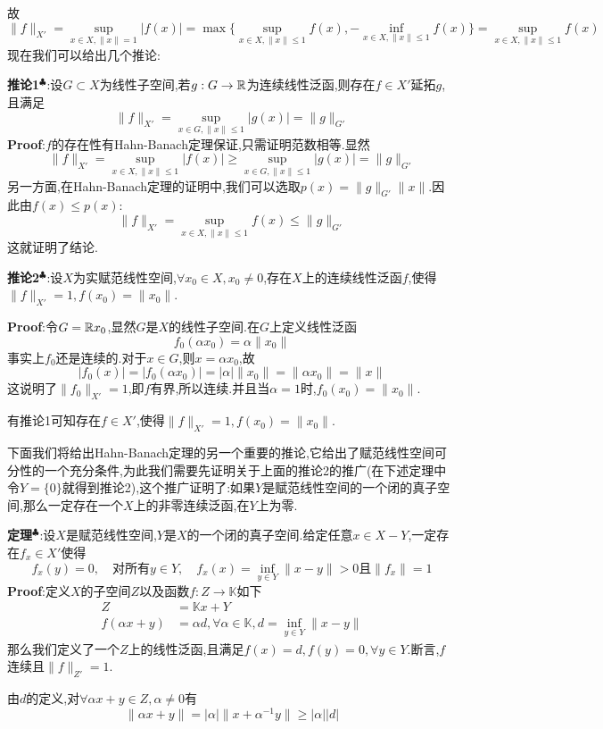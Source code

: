 故
$$
\|f\|_{X'}=\sup_{x\in X,\|x\|=1}|f(x)|=\max\{\sup_{x\in X,\|x\|\leqslant 1}f(x),-\inf_{x\in X,\|x\|\leqslant 1}f(x)\}=\sup_{x\in X,\|x\|\leqslant 1}f(x)
$$
\qquad 现在我们可以给出几个推论:\par
\textbf{推论1}$^\clubsuit $:设$G\subset X$为线性子空间,若$g:G\to \mathbb{R}$为连续线性泛函,则存在$f\in X'$延拓$g$,且满足
$$
\|f\|_{X'}=\sup_{x\in G,\|x\|\leqslant 1}|g(x)|=\|g\|_{G'}
$$
\qquad \textbf{Proof}:$f$的存在性有Hahn-Banach定理保证,只需证明范数相等.显然
$$
\|f\|_{X'}=\sup_{x\in X,\|x\|\leqslant 1}|f(x)|\geqslant \sup_{x\in G,\|x\|\leqslant 1}|g(x)|=\|g\|_{G'}
$$
另一方面,在Hahn-Banach定理的证明中,我们可以选取$p(x)=\|g\|_{G'}\|x\|$.因此由$f(x)\leqslant p(x)$:
$$
\|f\|_{X'}=\sup_{x\in X,\|x\|\leqslant 1}f(x)\leqslant \|g\|_{G'}
$$
这就证明了结论.\par
\textbf{推论2}$^\clubsuit $:设$X$为实赋范线性空间,$\forall x_0\in X,x_0\neq 0$,存在$X$上的连续线性泛函$f$,使得$\|f\|_{X'}=1,f(x_0)=\|x_0\|$.\par
\textbf{Proof}:令$G=\mathbb{R} x_0$,显然$G$是$X$的线性子空间.在$G$上定义线性泛函
$$
f_0(\alpha x_0)=\alpha\|x_0\|
$$
事实上$f_0$还是连续的.对于$x\in G$,则$x=\alpha x_0$,故
$$
|f_0(x)|=|f_0(\alpha x_0)|=|\alpha|\|x_0\|=\|\alpha x_0\|=\|x\|
$$
这说明了$\|f_0\|_{X'}=1$,即$f$有界,所以连续.并且当$\alpha=1$时,$f_0(x_0)=\|x_0\|$.\par
有推论1可知存在$f\in X'$,使得$\|f\|_{X'}=1,f(x_0)=\|x_0\|$.\par
下面我们将给出Hahn-Banach定理的另一个重要的推论,它给出了赋范线性空间可分性的一个充分条件,为此我们需要先证明关于上面的推论2的推广(在下述定理中令$Y=\{0\}$就得到推论2),这个推广证明了:如果$Y$是赋范线性空间的一个闭的真子空间,那么一定存在一个$X$上的非零连续泛函,在$Y$上为零.\par
\textbf{定理}$^\clubsuit $:设$X$是赋范线性空间,$Y$是$X$的一个闭的真子空间.给定任意$x\in X-Y$,一定存在$f_x\in X'$使得
$$
f_x(y)=0,\quad \text{对所有}y\in Y,\quad f_x(x)=\inf\limits_{y\in Y}\|x-y\|>0\text{且}\|f_x\|=1
$$
\qquad \textbf{Proof}:定义$X$的子空间$Z$以及函数$f:Z\to\mathbb{K}$如下
$$
\begin{aligned}
    Z &= \mathbb{K}x+Y\\
    f(\alpha x+y)& =\alpha d,\forall \alpha \in\mathbb{K},d=\inf\limits_{y\in Y}\|x-y\|
\end{aligned}
$$
那么我们定义了一个$Z$上的线性泛函,且满足$f(x)=d,f(y)=0,\forall y\in Y$.断言,$f$连续且$\|f\|_{Z'}=1$.\par
由$d$的定义,对$\forall \alpha x+y\in Z,\alpha\neq 0$有
$$
\|\alpha x+y\|=|\alpha|\|x+\alpha^{-1}y\|\geqslant |\alpha||d|
$$
